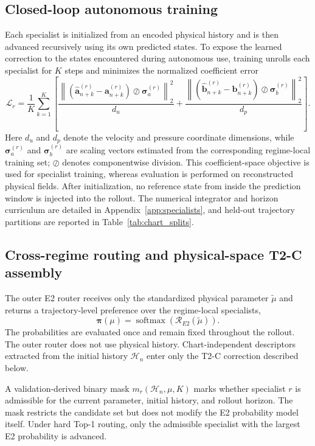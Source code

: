 \subsection{Closed-loop autonomous training}

Each specialist is initialized from an encoded physical history and is then advanced recursively using its own predicted states. To expose the learned correction to the states encountered during autonomous use, training unrolls each specialist for $K$ steps and minimizes the
normalized coefficient error
\begin{equation}
  \mathcal L_r=\frac{1}{K}\sum_{k=1}^{K}\left[
  \frac{\left\|(\widehat{\bm a}_{n+k}^{(r)}-\bm a_{n+k}^{(r)})
  \oslash\bm\sigma_a^{(r)}\right\|_2^2}{d_u}
  +\frac{\left\|(\widehat{\bm b}_{n+k}^{(r)}-\bm b_{n+k}^{(r)})
  \oslash\bm\sigma_b^{(r)}\right\|_2^2}{d_p}\right].
  \label{eq:main_rollout_loss}
\end{equation}
Here $d_u$ and $d_p$ denote the velocity and pressure coordinate dimensions, while $\bm\sigma_a^{(r)}$ and $\bm\sigma_b^{(r)}$ are scaling
vectors estimated from the corresponding regime-local training set; $\oslash$ denotes componentwise division. This coefficient-space objective is used for specialist training, whereas evaluation is performed on reconstructed physical fields. After initialization, no reference state from inside the prediction window is injected into the rollout. The numerical integrator and horizon curriculum are detailed in Appendix~\ref{app:specialists}, and held-out trajectory partitions are reported in Table~\ref{tab:chart_splits}.



\subsection{Cross-regime routing and physical-space T2-C assembly}

The outer E2 router receives only the standardized physical parameter $\widetilde\mu$ and returns a trajectory-level preference over the
regime-local specialists,
\[
\bm\pi(\mu)
=
\operatorname{softmax}\!\left(
\mathcal R_{E2}(\widetilde\mu)
\right).
\]
The probabilities are evaluated once and remain fixed throughout the rollout. The outer router does not use physical history. Chart-independent descriptors extracted from the initial history $\mathcal H_n$ enter only the T2-C correction described below.

A validation-derived binary mask $m_r(\mathcal H_n,\mu,K)$ marks whether specialist $r$ is admissible for the current parameter, initial history, and rollout horizon. The mask restricts the candidate set but does not modify the E2 probability
model itself. Under hard Top-1 routing, only the admissible specialist with the largest E2 probability is advanced.

